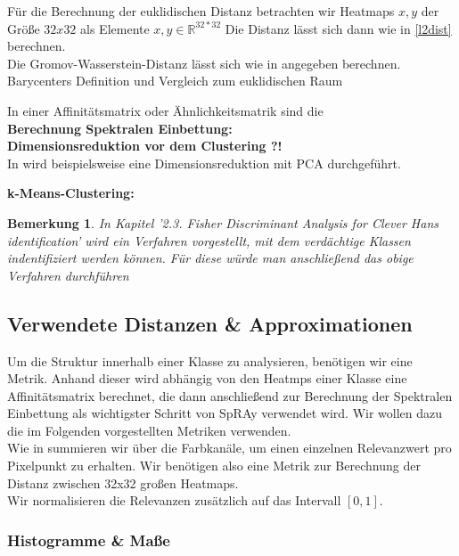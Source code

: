 \documentclass[twoside, 11pt,a4paper]{article}
\newtheorem{remark}[theorem]{Bemerkung}
\numberwithin{equation}{section}
\begin{document}
	Für die Berechnung der euklidischen Distanz betrachten wir Heatmaps $x,y$ der Größe $32x32$ als Elemente $x,y \in \mathbb{R}^{32*32}$ Die Distanz lässt sich dann wie in \autoref{l2dist} berechnen.\\
	
	Die Gromov-Wasserstein-Distanz lässt sich wie in \cite{gwd_averaging_kernels} angegeben berechnen. \\
	
	Barycenters Definition und Vergleich zum euklidischen Raum \cite{bary_wasserstein_space}
	
	In einer Affinitätsmatrix oder Ähnlichkeitsmatrik sind die \\
	
	\noindent \textbf{Berechnung Spektralen Einbettung:}\\
	
	\noindent \textbf{Dimensionsreduktion vor dem Clustering ?!}\\
	
	In \cite{AC} wird beispielsweise eine Dimensionsreduktion mit PCA durchgeführt.
	
	\noindent \textbf{k-Means-Clustering:}\\
	\begin{remark}
		In \cite{imagenet_unhansed_v1} Kapitel '2.3. Fisher Discriminant Analysis for Clever Hans
		identification' wird ein Verfahren vorgestellt, mit dem verdächtige Klassen indentifiziert werden können. Für diese würde man anschließend das obige Verfahren durchführen
	\end{remark}
	\subsection{Verwendete Distanzen \& Approximationen}
	Um die Struktur innerhalb einer Klasse zu analysieren, benötigen wir eine Metrik.
	Anhand dieser wird abhängig von den Heatmps einer Klasse eine Affinitätsmatrix berechnet, die dann anschließend zur Berechnung der Spektralen Einbettung als wichtigster Schritt von SpRAy verwendet wird. Wir wollen dazu die im Folgenden vorgestellten Metriken verwenden.\\
	Wie in \cite{imagenet_unhansed_v1} summieren wir über die Farbkanäle, um einen einzelnen Relevanzwert pro Pixelpunkt zu erhalten. Wir benötigen also eine Metrik zur Berechnung der Distanz zwischen 32x32 großen Heatmaps.\\
	Wir normalisieren die Relevanzen zusätzlich auf das Intervall $[0,1]$.
	
	\subsubsection{Histogramme \& Maße}
	
\end{document}
